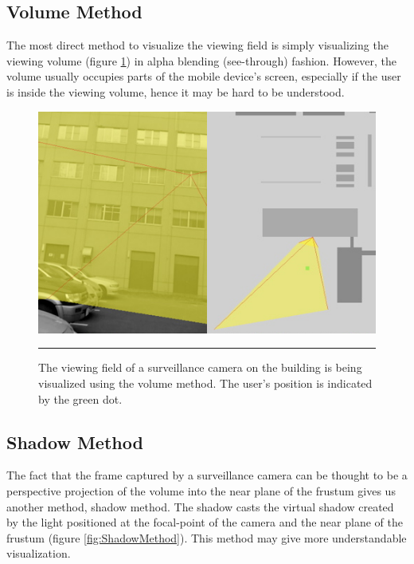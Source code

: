 \subsection{Volume Method}

The most direct method to visualize the viewing field is simply visualizing the viewing volume (figure \ref{fig:VolumeMethod}) in alpha blending (see-through) fashion. However, the volume usually occupies parts of the mobile device's screen, especially if the user is inside the viewing volume, hence it may be hard to be understood.

\begin{figure}[htbp]
	\centering
	\includegraphics[width=14cm]{./Primitives/theory_volume.png}
	\rule{35em}{0.5pt}
	\caption[Volume method]{The viewing field of a surveillance camera on the building is being visualized using the volume method. The user's position is indicated by the green dot.}
	\label{fig:VolumeMethod}
\end{figure}

\subsection{Shadow Method}
\label{ShadowMethod}

The fact that the frame captured by a surveillance camera can be thought to be a perspective projection of the volume into the near plane of the frustum gives us another method, shadow method. The shadow casts the virtual shadow created by the light positioned at the focal-point of the camera and the near plane of the frustum (figure \ref{fig:ShadowMethod}). This method may give more understandable visualization.

